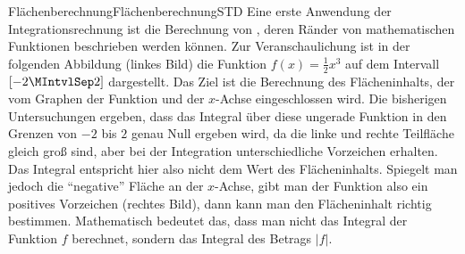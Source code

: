 \begin{MXContent}{Flächenberechnung}{Flächenberechnung}{STD}
Eine erste Anwendung der Integrationsrechnung ist die Berechnung von 
, deren Ränder von 
mathematischen Funktionen beschrieben werden können.
Zur Veranschaulichung ist in der folgenden Abbildung (linkes Bild) die 
Funktion $f(x) = \frac{1}{2} x^3$ auf dem Intervall $[-2\MIntvlSep 2]$ 
dargestellt. Das Ziel ist die Berechnung des Flächeninhalts, der vom Graphen 
der Funktion und der $x$-Achse eingeschlossen wird. Die bisherigen 
Untersuchungen ergeben, dass das Integral über diese ungerade Funktion in 
den Grenzen von $-2$ bis $2$ genau Null ergeben wird, da die linke und rechte 
Teilfläche gleich groß sind, aber bei der Integration unterschiedliche 
Vorzeichen erhalten. Das Integral entspricht hier also nicht dem Wert des 
Flächeninhalts.
Spiegelt man jedoch die "`negative"' Fläche an der $x$-Achse, gibt man der 
Funktion also ein positives Vorzeichen (rechtes Bild), dann kann man den 
Flächeninhalt richtig bestimmen. Mathematisch bedeutet das, dass man nicht 
das Integral der Funktion $f$ berechnet, sondern das Integral des Betrags 
$\left|f\right|$.


\end{MXContent}
